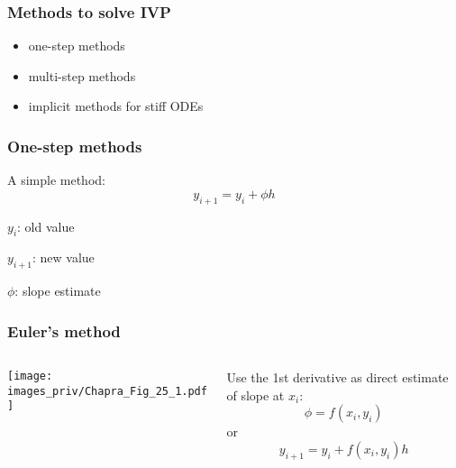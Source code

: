 \begin{frame}
\frametitle{Methods to solve IVP}
  
\begin{itemize}
\item one-step methods
\item multi-step methods
\item implicit methods for stiff ODEs
\end{itemize}

\end{frame}




\begin{frame}
\frametitle{One-step methods}

A simple method:
\begin{equation*}
y_{i+1} = y_{i} + \phi h
\end{equation*}

$y_{i}$: old value

$y_{i+1}$: new value

$\phi$: slope estimate

\end{frame}


\begin{frame}
\frametitle{Euler's method}

\begin{columns}

\begin{column}{0.5\textwidth}
  {\centering
  \texttt{[image: images\_priv/Chapra\_Fig\_25\_1.pdf]}
  \par}    
\end{column}

\begin{column}{0.5\textwidth}
  Use the 1st derivative as direct estimate of slope at $x_i$:
  \begin{equation*}
  \phi = f(x_i, y_i)
  \end{equation*}
  or
  \begin{equation*}
  y_{i+1} = y_{i} + f(x_i, y_i) h
  \end{equation*}
\end{column}

\end{columns}

\end{frame}



